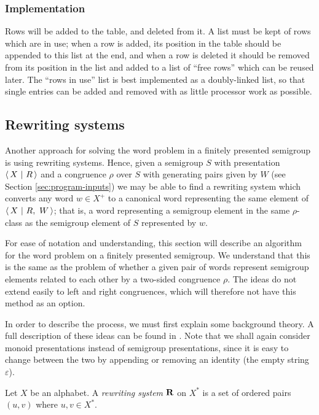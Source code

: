 \subsubsection{Implementation}

Rows will be added to the table, and deleted from it.  A list must be kept of
rows which are in use; when a row is added, its position in the table should be
appended to this list at the end, and when a row is deleted it should be removed
from its position in the list and added to a list of ``free rows'' which can be
reused later.  The ``rows in use'' list is best implemented as a doubly-linked
list, so that single entries can be added and removed with as little processor
work as possible.

\subsection{Rewriting systems}
\label{sec:kb}

Another approach for solving the word problem in a finitely presented semigroup
is using rewriting systems.  Hence, given a semigroup $S$ with presentation
$\left\langle\,X ~\middle|~ R\,\right\rangle$ and a congruence $\rho$ over $S$ with generating pairs given by $W$
(see Section \ref{sec:program-inputs})
we may be able to find a rewriting system which converts any word $w \in X^+$ to
a canonical word representing the same element of $\left\langle\,X ~\middle|~ R,\ W\,\right\rangle$;
that is, a word representing a semigroup element in the same $\rho$-class as
the semigroup element of $S$ represented by $w$.

For ease of notation and understanding, this section will describe an algorithm
for the word problem on a finitely presented semigroup.  We understand that this
is the same as the problem of whether a given pair of words represent semigroup
elements related to each other by a two-sided congruence $\rho$.  The ideas do
not extend easily to left and right congruences, which will therefore not have
this method as an option.

In order
to describe the process, we must first explain some background theory.  A full
description of these ideas can be found in \cite[Section 12.2]{cgt}.  Note that
we shall again consider monoid presentations instead of semigroup presentations,
since it is easy to change between the two by appending or removing an identity
(the empty string $\varepsilon$).

\begin{definition}
  \label{def:rws}
  Let $X$ be an alphabet.  A \textit{rewriting system} $\mathbf{R}$ on $X^*$ is a set
  of ordered pairs $(u,v)$ where $u, v \in X^*$.
\end{definition}

